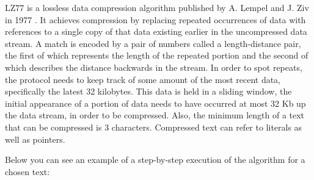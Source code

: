 LZ77 is a lossless data compression algorithm published by A. Lempel and J. Ziv
in 1977 \cite{lz77}. It achieves compression by replacing repeated occurrences 
of data with references to a single copy of that data existing earlier in the 
uncompressed data stream. A match is encoded by a pair of numbers called a 
length-distance pair, the first of which represents the length of the repeated
portion and the second of which describes the distance backwards in the stream.
In order to spot repeats, the protocol needs to keep track of some amount of the
most recent data, specifically the latest 32 kilobytes. This data is held in a
sliding window, the initial appearance of a portion of data needs to have occurred
at most 32 Kb up the data stream, in order to be compressed. Also, the minimum
length of a text that can be compressed is 3 characters. Compressed text can
refer to literals as well as pointers.

Below you can see an example of a step-by-step execution of the algorithm for a
chosen text:

